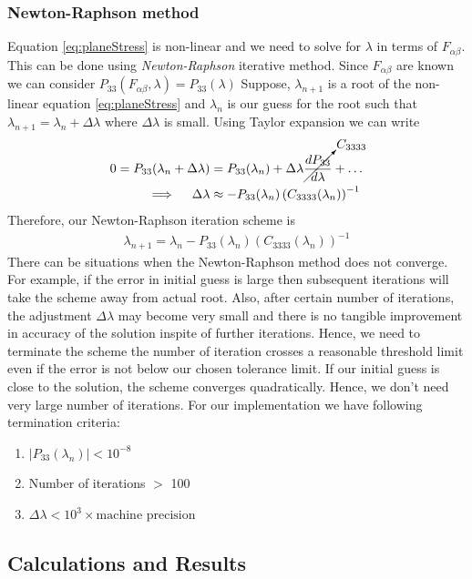 \message{ !name(p1_2.tex)}\documentclass[../main.tex]{subfiles}
\begin{document}
\subsubsection{Newton-Raphson method}
\label{sec:NR}
Equation \ref{eq:planeStress} is non-linear and we need to solve for
$\lambda$ in terms of $F_{\alpha\beta}$. This can be done using
\textit{Newton-Raphson} iterative method. Since $F_{\alpha\beta}$ are
known we can consider
$P_{33}(F_{\alpha\beta},\lambda) = P_{33}(\lambda)$ Suppose,
$\lambda_{n+1}$ is a root of the non-linear equation
\ref{eq:planeStress} and $\lambda_{n}$ is our guess for the root such
that $\lambda_{n+1}=\lambda_{n}+\Delta\lambda$ where $\Delta\lambda$
is small. Using Taylor expansion we can write
\begin{align*}
  0 = P_{33}(\lambda_n+\Delta\lambda) &=P_{33}(\lambda_n) + \Delta\lambda\cancelto{C_{3333}}{\frac{dP_{33}}{d\lambda}} + \ldots\\
  \implies \quad \Delta\lambda &\approx -P_{33}(\lambda_n)\left(C_{3333}(\lambda_n)\right)^{-1}
\end{align*}
Therefore, our Newton-Raphson iteration scheme is
\begin{align}
  \boxed{\lambda_{n+1} = \lambda_n- P_{33}(\lambda_n)\left(C_{3333}(\lambda_n)\right)^{-1}}
\end{align}
There can be situations when the Newton-Raphson method does not
converge. For example, if the error in initial guess is large then
subsequent iterations will take the scheme away from actual
root. Also, after certain number of iterations, the adjustment
$\Delta\lambda$ may become very small and there is no tangible
improvement in accuracy of the solution inspite of further
iterations. Hence, we need to terminate the scheme the number of
iteration crosses a reasonable threshold limit even if the error is
not below our chosen tolerance limit. If our initial guess is close to
the solution, the scheme converges quadratically. Hence, we don't need
very large number of iterations. For our implementation we have
following termination criteria:
\begin{enumerate}
\item $|P_{33}(\lambda_n)| < 10^{-8}$
\item Number of iterations $>$ 100
\item $\Delta\lambda < 10^3\times \text{machine precision}$
\end{enumerate}


\subsection{Calculations and Results}
\label{sec:calc}
\lstset{ basicstyle=\ttfamily, columns=fixed }
\end{document}
